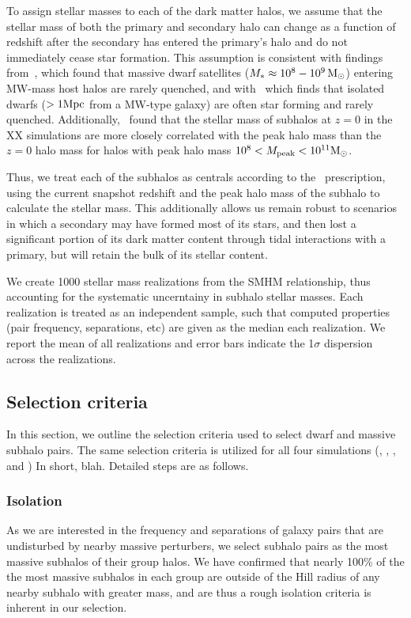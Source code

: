 \documentclass[twocolumn]{aastex631}
\begin{document}
To assign stellar masses to each of the dark matter halos, we assume that the stellar mass of both the primary and secondary halo can change as a function of redshift after the secondary has entered the primary's halo and do not immediately cease star formation.
This assumption is consistent with findings from~\cite{Akins2021}, which found that massive dwarf satellites ($M_*\approx 10^8-10^9\, \mathrm{M}_\odot$) entering MW-mass host halos are rarely quenched, and with~\cite{geha13} which finds that isolated dwarfs ($>1\mathrm{Mpc}$ from a MW-type galaxy) are often star forming and rarely quenched.
Additionally,~\citet{Munshi2021} found that the stellar mass of subhalos at $z=0$ in the XX simulations are more closely correlated with the peak halo mass than the $z=0$ halo mass for halos with peak halo mass $10^8<M_{\rm peak}<10^{11} \mathrm{M}_\odot$. 

Thus, we treat each of the subhalos as centrals according to the~\citet{moster13} prescription, using the current snapshot redshift and the peak halo mass of the subhalo to calculate the stellar mass. 
This additionally allows us remain robust to scenarios in which a secondary may have formed most of its stars, and then lost a significant portion of its dark matter content through tidal interactions with a primary, but will retain the bulk of its stellar content.

We create 1000 stellar mass realizations from the SMHM relationship, thus accounting for the systematic uncerntainy in subhalo stellar masses. Each realization is treated as an independent sample, such that computed properties (pair frequency, separations, etc) are given as the median each realization. We report the mean of all realizations and error bars indicate the 1$\sigma$ dispersion across the realizations.
\subsection{Selection criteria}\label{sec:methods-crit}
In this section, we outline the selection criteria used to select dwarf and massive subhalo pairs. 
The same selection criteria is utilized for all four simulations (\illd, \illh, \tngd, and \tngh)
In short, blah. 
Detailed steps are as follows. 

\subsubsection{Isolation}
As we are interested in the frequency and separations of galaxy pairs that are undisturbed by nearby massive perturbers, we select subhalo pairs as the most massive subhalos of their group halos. 
We have confirmed that nearly 100\% of the the most massive subhalos in each group are outside of the Hill radius of any nearby subhalo with greater mass, and are thus a rough isolation criteria is inherent in our selection.
\end{document}
